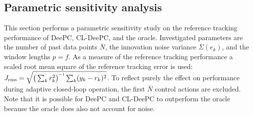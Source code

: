 \subsection{Parametric sensitivity analysis}\label{sec:sensitivity_study}
\noindent This section performs a parametric sensitivity study on the reference tracking performance of \ac{DeePC}, \ac{CL-DeePC}, and the oracle. %
Investigated parameters are the number of past data points $\bar{N}$, the innovation noise variance $\Sigma(e_k)$, and the window lengths $p=f$. As a measure of the reference tracking performance a scaled root mean square of the reference tracking error is used: $J_\mathrm{rms}=\sqrt{\big(\sum_k r_k^2\big)\inv\sum_k(y_k-r_k)^2}$. %
To reflect purely the effect on performance during adaptive closed-loop operation, the first $\bar{N}$ control actions are excluded. Note that it is possible for \ac{DeePC} and \ac{CL-DeePC} to outperform the oracle because the oracle does also not account for noise.

